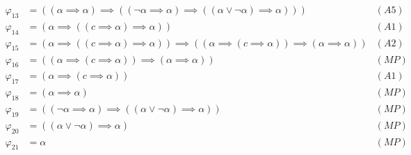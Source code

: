 \begin{sol}
\begin{align*}
        \varphi_{13} & = ((\alpha\implies\alpha)\implies((\neg\alpha\implies\alpha)\implies((\alpha\vee\neg\alpha)\implies\alpha)))                             & (A5)  \\
        \varphi_{14} & = (\alpha\implies((c\implies\alpha)\implies\alpha))                                                                                        & (A1)  \\
        \varphi_{15} & = (\alpha\implies((c\implies\alpha)\implies\alpha))\implies((\alpha\implies(c\implies\alpha))\implies(\alpha\implies\alpha))             & (A2)  \\
        \varphi_{16} & = ((\alpha\implies(c\implies\alpha))\implies(\alpha\implies\alpha))                                                                        & (MP)  \\
        \varphi_{17} & = (\alpha\implies(c\implies\alpha))                                                                                                      & (A1)  \\
        \varphi_{18} & = (\alpha\implies\alpha)                                                                                                                   & (MP)  \\
        \varphi_{19} & = ((\neg\alpha\implies\alpha)\implies((\alpha\vee\neg\alpha)\implies\alpha))                                                             & (MP)  \\
        \varphi_{20} & = ((\alpha\vee\neg\alpha)\implies\alpha)                                                                                                   & (MP)  \\
        \varphi_{21} & = \alpha                                                                                                                                 & (MP)
    \end{align*}
\end{sol}
